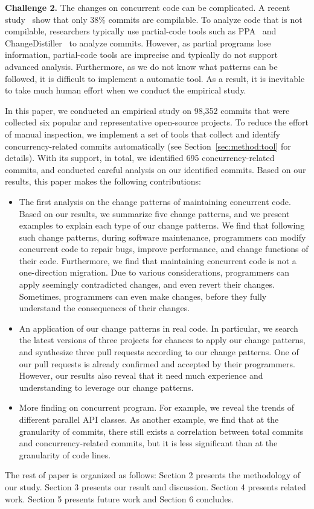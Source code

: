 \noindent
\textbf{Challenge 2.} The changes on concurrent code can be complicated. A recent study~\cite{tufano2016there} show that only 38\% commits are compilable. To analyze code that is not compilable, researchers typically use partial-code tools such as PPA~\cite{DagenaisH08ppa} and ChangeDistiller~\cite{fluri2007change} to analyze commits. However, as partial programs lose information, partial-code tools are imprecise and typically do not support advanced analysis. Furthermore, as we do not know what patterns can be followed, it is difficult to implement a automatic tool. As a result, it is inevitable to take much human effort when we conduct the empirical study.

In this paper, we conducted an empirical study on 98,352 commits that were collected six popular and representative open-source projects. To reduce the effort of manual inspection, we implement a set of tools that collect and identify concurrency-related commits automatically (see Section~\ref{sec:method:tool} for details). With its support, in total, we identified 695 concurrency-related commits, and conducted careful analysis on our identified commits. Based on our results, this paper makes the following contributions:

\begin{itemize}
	\item The first analysis on the change patterns of maintaining concurrent code. Based on our results, we summarize five change patterns, and we present examples to explain each type of our change patterns. We find that following such change patterns, during software maintenance, programmers can modify concurrent code to repair bugs, improve performance, and change functions of their code. Furthermore, we find that maintaining concurrent code is not a one-direction migration. Due to various considerations, programmers can apply seemingly contradicted changes, and even revert their changes. Sometimes, programmers can even make changes, before they fully understand the consequences of their changes.
	\item An application of our change patterns in real code. In particular, we search the latest versions of three projects for chances to apply our change patterns, and synthesize three pull requests according to our change patterns. One of our pull requests is already confirmed and accepted by their programmers. However, our results also reveal that it need much experience and understanding to leverage our change patterns. 
	\item More finding on concurrent program. For example, we reveal the trends of different parallel API classes. As another example, we find that at the granularity of commits, there still exists a correlation between total commits and concurrency-related commits, but it is less significant than at the granularity of code lines. 
\end{itemize}

The rest of paper is organized as follows: Section 2 presents the methodology of our study. Section 3 presents our result and discussion. Section 4 presents related work. Section 5 presents future work and Section 6 concludes.
